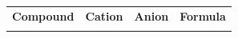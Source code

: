 \begin{enumerate}[noitemsep, label=\textbf{\arabic*}. ]
{{    \addtocounter{footnote}{-0}
    
          }{ %
        
    
        \begin{center}
      
      \label{m38689*id145067}
      
    \noindent
      \tablelasttail{}
      \begin{xtabular}[t]{|l|l|l|l|}\hline
    
    
        \textbf{Compound} &
    
    
        \textbf{Cation} &
    
    
        \textbf{Anion} &
    
    
        \textbf{Formula}%
     \tabularnewline{}
    
    
         &
    
    

\end{xtabular}
\end{center}}}
\end{enumerate}
